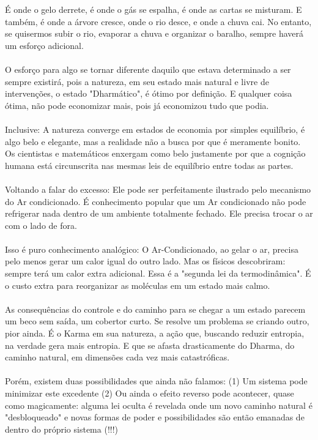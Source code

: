 \documentclass[11pt]{article}
\begin{document}
É onde o gelo derrete, é onde o gás se espalha, é onde as cartas se misturam. E também, é onde a árvore cresce, onde o rio desce, e onde a chuva cai. No entanto, se quisermos subir o rio, evaporar a chuva e organizar o baralho, sempre haverá um esforço adicional.\\\\

O esforço para algo se tornar diferente daquilo que estava determinado a ser sempre existirá, pois a natureza, em seu estado mais natural e livre de intervenções, o estado "Dharmático", é ótimo por definição. E qualquer coisa ótima, não pode economizar mais, pois já economizou tudo que podia.\\\\

Inclusive: A natureza converge em estados de economia por simples equilíbrio, é algo belo e elegante, mas a realidade não a busca por que é meramente bonito. Os cientistas e matemáticos enxergam como belo justamente por que a cognição humana está circunscrita nas mesmas leis de equilíbrio entre todas as partes.\\\\

Voltando a falar do excesso: Ele pode ser perfeitamente ilustrado pelo mecanismo do Ar condicionado. É conhecimento popular que um Ar condicionado não pode refrigerar nada dentro de um ambiente totalmente fechado. Ele precisa trocar o ar com o lado de fora. \\\\

Isso é puro conhecimento analógico: O Ar-Condicionado, ao gelar o ar, precisa pelo menos gerar um calor igual do outro lado. Mas os físicos descobriram: sempre terá um calor extra adicional. Essa é a "segunda lei da termodinâmica". É o custo extra para reorganizar as moléculas em um estado mais calmo.\\\\

As consequências do controle e do caminho para se chegar a um estado parecem um beco sem saída, um cobertor curto. Se resolve um problema se criando outro, pior ainda. É o Karma em sua natureza, a ação que, buscando reduzir entropia, na verdade gera mais entropia. E que se afasta drasticamente do Dharma, do caminho natural, em dimensões cada vez mais catastróficas.\\\\ 

Porém, existem duas possibilidades que ainda não falamos: (1) Um sistema pode minimizar este excedente (2) Ou ainda o efeito reverso pode acontecer, quase como magicamente: alguma lei oculta é revelada onde um novo caminho natural é "desbloqueado" e novas formas de poder e possibilidades são então emanadas de dentro do próprio  sistema (!!!)\\\\
\end{document}
